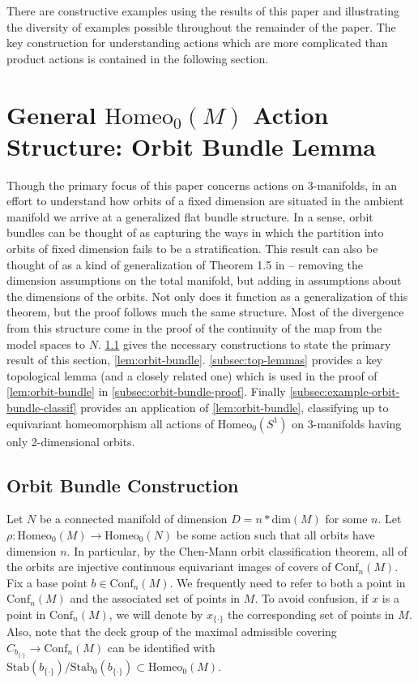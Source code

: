 \documentclass[10pt, oneside]{article}
\newcommand{\homeo}[1][S^1]{\text{Homeo}_0(#1)}
\newcommand{\conf}[2][S^1]{\text{Conf}_{#2}(#1)}
\newcommand{\set}{{\{\cdot\}}}
\newcommand{\stab}[1]{\text{Stab}(#1)}
\newcommand{\pstab}[1]{\text{Stab}_0(#1)}
\newcommand{\maxcov}{C_{b_\set}}
\theoremstyle{definition}
\theoremstyle{definition}
\begin{document}
There are constructive examples using the results of this paper and illustrating the diversity of examples possible throughout the remainder of the paper. The key construction for understanding actions which are more complicated than product actions is contained in the following section.


\section{General \texorpdfstring{$\homeo[M]$}{Homeo\_0(M)} Action Structure: Orbit Bundle Lemma}\label{sec:orbit-bundle-lemma}
Though the primary focus of this paper concerns actions on 3-manifolds, in an effort to understand how orbits of a fixed dimension are situated in the ambient manifold we arrive at a generalized flat bundle structure. In a sense, orbit bundles can be thought of as capturing the ways in which the partition into orbits of fixed dimension fails to be a stratification. This result can also be thought of as a kind of generalization of Theorem 1.5 in \cite{chen:StructureTheorems} -- removing the dimension assumptions on the total manifold, but adding in assumptions about the dimensions of the orbits. Not only does it function as a generalization of this theorem, but the proof follows much the same structure. Most of the divergence from this structure come in the proof of the continuity of the map from the model spaces to $N$. \cref{subsec:orbit-bundle-construction} gives the necessary constructions to state the primary result of this section, \cref{lem:orbit-bundle}. \cref{subsec:top-lemmas} provides a key topological lemma (and a closely related one) which is used in the proof of \cref{lem:orbit-bundle} in \cref{subsec:orbit-bundle-proof}. Finally \cref{subsec:example-orbit-bundle-classif} provides an application of \cref{lem:orbit-bundle}, classifying up to equivariant homeomorphism all actions of $\homeo$ on 3-manifolds having only 2-dimensional orbits.

\subsection{Orbit Bundle Construction}\label{subsec:orbit-bundle-construction}
Let $N$ be a connected manifold of dimension $D=n*\text{dim}(M)$ for some $n$. Let $\rho:\homeo[M]\to\homeo[N]$ be some action such that all orbits have dimension $n$. In particular, by the Chen-Mann orbit classification theorem, all of the orbits are injective continuous equivariant images of covers of $\conf[M]{n}$.
Fix a base point $b\in \conf[M]{n}$. 
We frequently need to refer to both a point in $\conf[M]{n}$
and the associated set of points in $M$.
To avoid confusion,
if $x$ is a point in $\conf[M]{n}$,
we will denote by $x_\set$ the corresponding set of points in $M$.
Also, 
note that the deck group of the maximal admissible covering $\maxcov \to \conf[M]{n}$ can be identified with $\stab{b_\set}/\pstab{b_\set}\subset\homeo[M]$.
\end{document}
